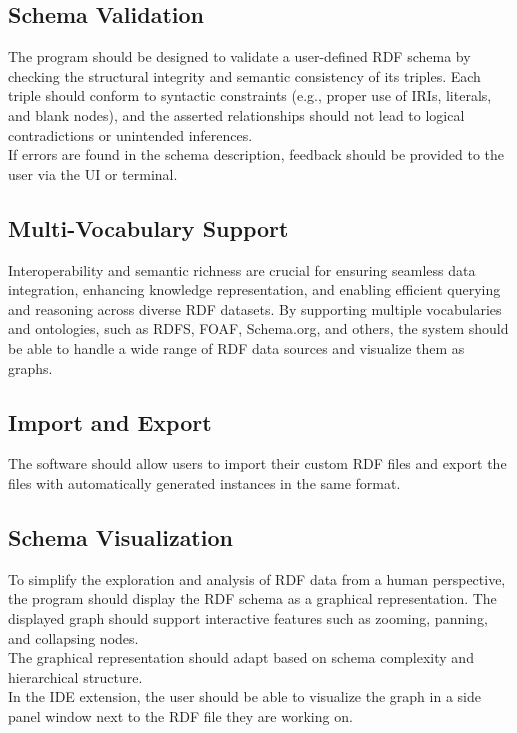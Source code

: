 \subsection{Schema Validation\label{sec:reqsuba}}
The program should be designed to validate a user-defined RDF schema by checking the structural integrity and semantic consistency of its triples. 
Each triple should conform to syntactic constraints (e.g., proper use of IRIs, literals, and blank nodes), and the asserted relationships should not lead to logical contradictions or unintended inferences.
\\
If errors are found in the schema description, feedback should be provided to the user via the UI or terminal.

\subsection{Multi-Vocabulary Support\label{sec:reqsuba}}
Interoperability and semantic richness are crucial for ensuring seamless data integration, enhancing knowledge representation, and enabling efficient querying and reasoning across diverse RDF datasets.
By supporting multiple vocabularies and ontologies, such as RDFS, FOAF, Schema.org, and others, the system should be able to handle a wide range of RDF data sources and visualize them as graphs.

\subsection{Import and Export\label{sec:reqsuba}}
The software should allow users to import their custom RDF files and export the files with automatically generated instances in the same format.

\subsection{Schema Visualization\label{sec:reqsuba}}
To simplify the exploration and analysis of RDF data from a human perspective, the program should display the RDF schema as a graphical representation.
The displayed graph should support interactive features such as zooming, panning, and collapsing nodes.
\\
The graphical representation should adapt based on schema complexity and hierarchical structure.
\\
In the IDE extension, the user should be able to visualize the graph in a side panel window next to the RDF file they are working on.

